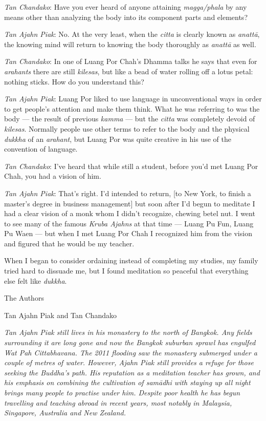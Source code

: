 \emph{Tan Chandako}: Have you ever heard of anyone attaining
\emph{magga/phala} by any means other than analyzing the body into its
component parts and elements?

\emph{Tan Ajahn Piak}: No. At the very least, when the \emph{citta} is
clearly known as \emph{anattā}, the knowing mind will return to knowing
the body thoroughly as \emph{anattā} as well.

\emph{Tan Chandako}: In one of Luang Por Chah's Dhamma talks he says
that even for \emph{arahants} there are still \emph{kilesas}, but like a
bead of water rolling off a lotus petal: nothing sticks. How do you
understand this?

\emph{Tan Ajahn Piak}: Luang Por liked to use language in unconventional
ways in order to get people's attention and make them think. What he was
referring to was the body --- the result of previous \emph{kamma} ---
but the \emph{citta} was completely devoid of \emph{kilesas}. Normally
people use other terms to refer to the body and the physical
\emph{dukkha} of an \emph{arahant}, but Luang Por was quite creative in
his use of the convention of language.

\emph{Tan Chandako}: I've heard that while still a student, before you'd
met Luang Por Chah, you had a vision of him.

\emph{Tan Ajahn Piak}: That's right. I'd intended to return, {[}to New
York, to finish a master's degree in business management{]} but soon
after I'd begun to meditate I had a clear vision of a monk whom I didn't
recognize, chewing betel nut. I went to see many of the famous
\emph{Kruba Ajahns‎‎} at that time --- Luang Pu Fun, Luang Pu Waen ---
but when I met Luang Por Chah I recognized him from the vision and
figured that he would be my teacher.

When I began to consider ordaining instead of completing my studies, my
family tried hard to dissuade me, but I found meditation so peaceful
that everything else felt like \emph{dukkha}.



The Authors

Tan Ajahn Piak and Tan Chandako

\emph{Tan Ajahn Piak still lives in his monastery to the north of
Bangkok. Any fields surrounding it are long gone and now the Bangkok
suburban sprawl has engulfed Wat Pah Cittabhavana. The 2011 flooding saw
the monastery submerged under a couple of metres of water. However,
Ajahn Piak still provides a refuge for those seeking the Buddha's path.
His reputation as a meditation teacher has grown, and his emphasis on
combining the cultivation of samādhi with staying up all night brings
many people to practise under him. Despite poor health he has begun
travelling and teaching abroad in recent years, most notably in
Malaysia, Singapore, Australia and New Zealand.}

